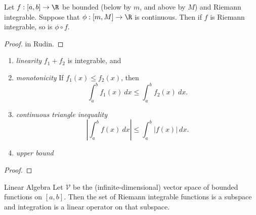 \documentclass{notes}
\begin{document}
\begin{theorem}
  Let $f:[a,b] \to \R$ be bounded (below by $m$, and above by $M$) and Riemann integrable. Suppose
  that $\phi:[m, M] \to \R$ is continuous. Then if $f$ is Riemann integrable, so is $\phi\circ f$.
\end{theorem}
\begin{proof}
in Rudin.  
\end{proof}

\begin{theorem}\leavevmode
 \begin{enumerate}
   \item \emph{linearity}
     $f_1 + f_2$ is integrable, and 
   \item \emph{monotonicity}
     If $f_1(x) \leq f_2(x)$, then $$\int_a^b f_1(x)\ dx \leq \int_a^b f_2(x)\ dx.$$
   \item \emph{continuous triangle inequality}
     $$\left| \int_a^bf(x)\ dx \right| \leq \int_a^b |f(x)|\ dx.$$
   \item \emph{upper bound}
 \end{enumerate} 
\end{theorem}
\begin{proof}
  
\end{proof}
\begin{aside}{Linear Algebra}
  Let $\mathcal{V}$ be the (infinite-dimensional) vector space of bounded functions on $[a,b]$. Then 
the set of Riemann integrable functions is a subspace and integration is a linear operator on that
subspace.
\end{aside}
\end{document}
